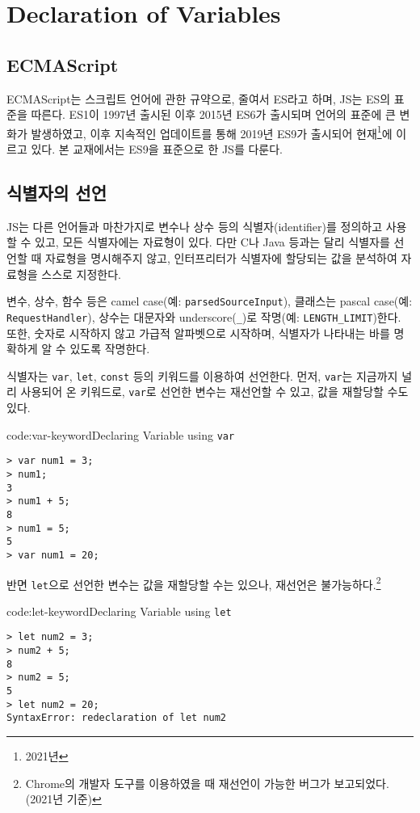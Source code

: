 \section{Declaration of Variables} \label{sect:declaration-of-variables}

\subsection*{ECMAScript}

ECMAScript는 스크립트 언어에 관한 규약으로, 줄여서 ES라고 하며, JS는 ES의 표준을 따른다. ES1이 1997년 출시된 이후 2015년 ES6가 출시되며 언어의 표준에 큰 변화가 발생하였고, 이후 지속적인 업데이트를 통해 2019년 ES9가 출시되어 현재\footnote{2021년}에 이르고 있다. 본 교재에서는 ES9을 표준으로 한 JS를 다룬다.

\subsection*{식별자의 선언}

JS는 다른 언어들과 마찬가지로 변수나 상수 등의 식별자(identifier)를 정의하고 사용할 수 있고, 모든 식별자에는 자료형이 있다. 다만 C나 Java 등과는 달리 식별자를 선언할 때 자료형을 명시해주지 않고, 인터프리터가 식별자에 할당되는 값을 분석하여 자료형을 스스로 지정한다.

변수, 상수, 함수 등은 camel case(예: \texttt{parsedSourceInput}), 클래스는 pascal case(예: \texttt{RequestHandler}), 상수는 대문자와 underscore(\texttt{\_})로 작명(예: \texttt{LENGTH\_LIMIT})한다. 또한, 숫자로 시작하지 않고 가급적 알파벳으로 시작하며, 식별자가 나타내는 바를 명확하게 알 수 있도록 작명한다.

식별자는 \texttt{var}, \texttt{let}, \texttt{const} 등의 키워드를 이용하여 선언한다. 먼저, \texttt{var}는 지금까지 널리 사용되어 온 키워드로, \texttt{var}로 선언한 변수는 재선언할 수 있고, 값을 재할당할 수도 있다.

\begin{codeenv}{code:var-keyword}{Declaring Variable using \texttt{var}}\begin{verbatim}
> var num1 = 3;
> num1;
3
> num1 + 5;
8
> num1 = 5;
5
> var num1 = 20;
\end{verbatim}
\end{codeenv}

반면 \texttt{let}으로 선언한 변수는 값을 재할당할 수는 있으나, 재선언은 불가능하다.\footnote{Chrome의 개발자 도구를 이용하였을 때 재선언이 가능한 버그가 보고되었다. (2021년 기준)}

\begin{codeenv}{code:let-keyword}{Declaring Variable using \texttt{let}}\begin{verbatim}
> let num2 = 3;
> num2 + 5;
8
> num2 = 5;
5
> let num2 = 20;
SyntaxError: redeclaration of let num2
\end{verbatim}
\end{codeenv}
\newpage

